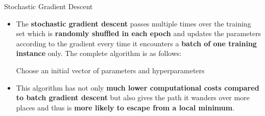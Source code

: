 \documentclass[main.tex]{subfiles}
\begin{document}
    \begin{frame}{Stochastic Gradient Descent}
        \begin{itemize}
            \item The \textbf{stochastic gradient descent} passes multiple times over the training set which is \textbf{randomly shuffled in each epoch} and updates the parameters according to the gradient every time it encounters a \textbf{batch of one training instance} only. The complete algorithm is as follows:
            
            \begin{center}
                \begin{minipage}{.9\linewidth}
                    \begin{algorithm}[H]
                        \DontPrintSemicolon
                        \caption{Stochastic Gradient Descent}
                        Choose an initial vector of parameters and hyperparameters\;
                    \end{algorithm}
                \end{minipage}
            \end{center}
        
            \vspace*{2mm}
            \item This algorithm has not only \textbf{much lower computational costs compared to batch gradient descent} but also gives the path it wanders over more places and thus is \textbf{more likely to escape from a local minimum}.
        \end{itemize}
    \end{frame}	
\end{document}

